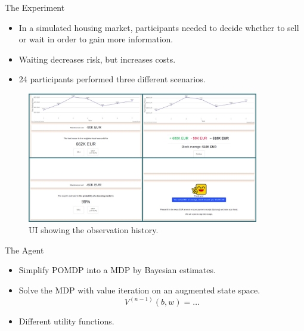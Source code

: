 

\begin{block}{The Experiment}
\begin{itemize}
    \item In a simulated housing market, participants needed to decide whether to sell or wait in order to gain more information.
    \item Waiting decreases risk, but increases costs.
    \item 24 participants performed three different scenarios.
\end{itemize}

\begin{figure}
  \centering
    \includegraphics[width=0.9\textwidth]{img/methods/pjimage.jpg}
  \caption{UI showing the observation history.}
\end{figure}

\end{block}


\begin{block}{The Agent}



\begin{itemize}
    \item Simplify POMDP into a MDP by Bayesian estimates. %
    \item Solve the MDP with value iteration on an augmented state space.
    \[V^{(n-1)}(b,w) =\ldots\]
    \item Different utility functions.
\end{itemize}

\end{block}

